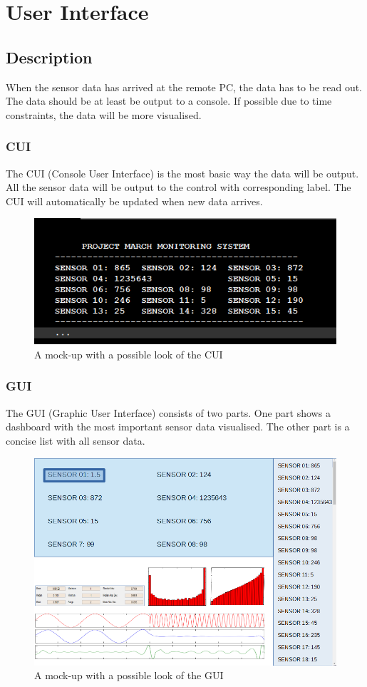 \section{User Interface}
\subsection{Description}
When the sensor data has arrived at the remote PC, the data has to be read out. The data should be at least be output to a console. If possible due to time constraints, the data will be more visualised.
\subsubsection{CUI}
The CUI (Console User Interface) is the most basic way the data will be output. All the sensor data will be output to the control with corresponding label. The CUI will automatically be updated when new data arrives. 
\begin{figure}[H]
	\centering
	\includegraphics[width=.75\textwidth]{MockupCUI}
	\caption{A mock-up with a possible look of the CUI} 
\end{figure} 
\subsubsection{GUI}
The GUI (Graphic User Interface) consists of two parts. One part shows a dashboard with the most important sensor data visualised. The other part is a concise list with all sensor data.  
\begin{figure}[H]
	\centering
	\includegraphics[width=.75\textwidth]{MockupGUI}
	\caption{A mock-up with a possible look of the GUI} 
\end{figure} 
